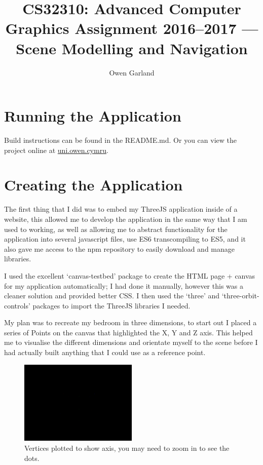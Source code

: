 \documentclass[runningheads,a4paper]{llncs}
\begin{document}
\title{CS32310: Advanced Computer Graphics Assignment 2016--2017 — Scene Modelling and Navigation}

\author{Owen Garland}



\maketitle
\clearpage

\section{Running the Application}
Build instructions can be found in the README.md. Or you can view the project online at \href{http://uni.owen.cymru}{uni.owen.cymru}.

\section{Creating the Application}
  The first thing that I did was to embed my ThreeJS application inside of a website, this allowed me to develop the application in the same way that I am used to working, as well as allowing me to abstract functionality for the application into several javascript files, use ES6 transcompiling to ES5, and it also gave me access to the npm repository to easily download and manage libraries. 

  I used the excellent `canvas-testbed' package to create the HTML page + canvas for my application automatically; I had done it manually, however this was a cleaner solution and provided better CSS\@. I then used the `three' and `three-orbit-controls' packages to import the ThreeJS libraries I needed. 

  My plan was to recreate my bedroom in three dimensions, to start out I placed a series of Points on the canvas that highlighted the X, Y and Z axis. This helped me to visualise the different dimensions and orientate myself to the scene before I had actually built anything that I could use as a reference point. 
  
  \begin{figure}[H]
    \centering
    \includegraphics[width=0.5\textwidth]{images/1.png}
    \caption{Vertices plotted to show axis, you may need to zoom in to see the dots.}
    \label{fig:window}
  \end{figure}
\end{document}
